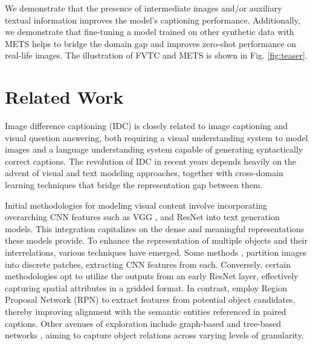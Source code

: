 \documentclass[10pt,twocolumn,letterpaper]{article}
\begin{document}
We demonstrate that the presence of intermediate images and/or auxiliary textual information improves the model's captioning performance. Additionally, we demonstrate that fine-tuning a model trained on other synthetic data with METS helps to bridge the domain gap and improves zero-shot performance on real-life images. The illustration of FVTC and METS is shown in Fig. \ref{fig:teaser}.



\section{Related Work}

Image difference captioning (IDC) is closely related to image captioning and visual question answering, both requiring a visual understanding system to model images and a language understanding system capable of generating syntactically correct captions. The revolution of IDC in recent years depends heavily on the advent of visual and text modeling approaches, together with cross-domain learning techniques that bridge the representation gap between them.

Initial methodologies for modeling visual content involve incorporating overarching CNN features such as VGG \cite{donahue2015long}, and ResNet \cite{rennie2017self} into text generation models. This integration capitalizes on the dense and meaningful representations these models provide. To enhance the representation of multiple objects and their interrelations, various techniques have emerged. Some methods \cite{lu2017knowing,gu2018stack,anderson2018bottom,huang2019adaptively}, partition images into discrete patches, extracting CNN features from each. Conversely, certain methodologies opt to utilize the outputs from an early ResNet layer, effectively capturing spatial attributes in a gridded format. In contrast, \cite{cornia2020meshed,anderson2018bottom,huang2019adaptively} employ Region Proposal Network (RPN) to extract features from potential object candidates, thereby improving alignment with the semantic entities referenced in paired captions. Other avenues of exploration include graph-based \cite{yang2019auto} and tree-based networks \cite{yao2019hierarchy}, aiming to capture object relations across varying levels of granularity.

\end{document}
